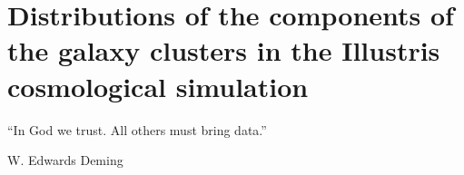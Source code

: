 
\setcounter{chapter}{2}
\chapter{Distributions of the components of the galaxy clusters in the
Illustris cosmological simulation}{}{}
\label{chapter3}
\epigraph{``In God we trust. All others must bring data.''}{W. Edwards
Deming} 
